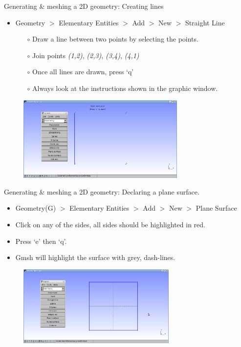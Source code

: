 \documentclass[t]{beamer}
\begin{document}
\begin{frame}{Generating \& meshing a 2D geometry: Creating lines}
\begin{itemize}
\item Geometry $>$ Elementary Entities $>$ Add $>$ New $>$ Straight Line
\begin{itemize}
\item[$\circ$] Draw a line between two points by selecting the points.
\item[$\circ$] Join points \emph{(1,2)}, \emph{(2,3)}, \emph{(3,4)}, \emph{(4,1)}
\item[$\circ$] Once all lines are drawn, press `q'
\item[$\circ$] Always look at the instructions shown in the graphic window.
\end{itemize}
\end{itemize}
\begin{figure}[htbp]
 \centering
  \includegraphics[width=0.74\textwidth]{../figures/Gmsh_dawing_lines.png}
\end{figure}
\end{frame}

\begin{frame}{Generating \& meshing a 2D geometry: Declaring a plane surface.}
\begin{itemize}
\item Geometry(G) $>$ Elementary Entities $>$ Add $>$ New $>$ Plane Surface
\item Click on any of the sides, all sides should be highlighted in red.
\item Press `e' then `q'.
\item Gmsh will highlight the surface with grey, dash-lines.
\end{itemize}
\begin{figure}[htbp]
 \centering
  \includegraphics[width=0.7\textwidth]{../figures/2d-example-surface}
\end{figure}
\end{frame}
\end{document}
